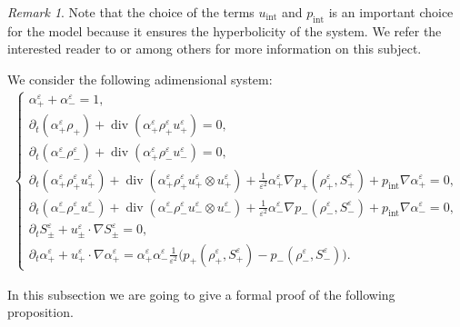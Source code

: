 \documentclass[11pt, twoside, a4paper]{article}
\theoremstyle{plain}
\theoremstyle{remark}
\newtheorem{remark}[theorem]{Remark}
\numberwithin{equation}{section}
\renewcommand{\div}{\operatorname{div}}
\newcommand{\dt}{\partial_t}
\newcommand{\eps}{\varepsilon}
\newcommand{\ap}{\alpha_+}
\newcommand{\am}{\alpha_-}
\newcommand{\rp}{\rho_+}
\newcommand{\rmi}{\rho_-}
\begin{document}
\begin{remark}
Note that the choice of the terms $u_{\mathrm{int}}$ and $p_{\mathrm{int}}$ is an important choice for the model because it ensures the hyperbolicity of the system. We refer the interested reader to \cite{coquel2002closure} or \cite{gallouet2010hyperbolic}  among others for more information on this subject.\newline
\end{remark}

We consider the following adimensional system:
\begin{align}\label{noniPDE}
    \left\{
        \begin{array}{l}
            \ap^\eps + \am^\eps = 1,\\
            \dt (\ap^\eps \rp) + \div(\ap^\eps \rp^\eps u_+^\eps) = 0,\\
            \dt (\am^\eps \rmi^\eps) + \div(\ap^\eps \rmi^\eps u_-^\eps) = 0,\\
            \dt (\ap^\eps \rp^\eps u_+^\eps) + \div (\ap^\eps \rp^\eps u_+^\eps \otimes u_+^\eps) + \frac{1}{\eps^2} \ap^\eps \nabla p_+(\rp^\eps, S_+^\eps) + p_{\mathrm{int}} \nabla \ap^\eps = 0,\\
            \dt (\am^\eps \rmi^\eps u_-^\eps) + \div (\am^\eps \rmi^\eps u_-^\eps \otimes u_-^\eps) + \frac{1}{\eps^2} \am^\eps \nabla p_-(\rmi^\eps, S_-^\eps) + p_{\mathrm{int}} \nabla \am^\eps = 0,\\
            \dt S_\pm^\eps + u_\pm^\eps \cdot \nabla S_\pm^\eps = 0,\\
            \dt \ap^\eps + u_+^\eps \cdot \nabla \ap^\eps = \ap^\eps \am^\eps \frac{1}{\eps^2} \Big(p_+(\rp^\eps, S_+^\eps)-p_-(\rmi^\eps, S_-^\eps)\Big).
        \end{array}
    \right.
\end{align}

In this subsection we are going to give a formal proof of the following proposition.
\end{document}
